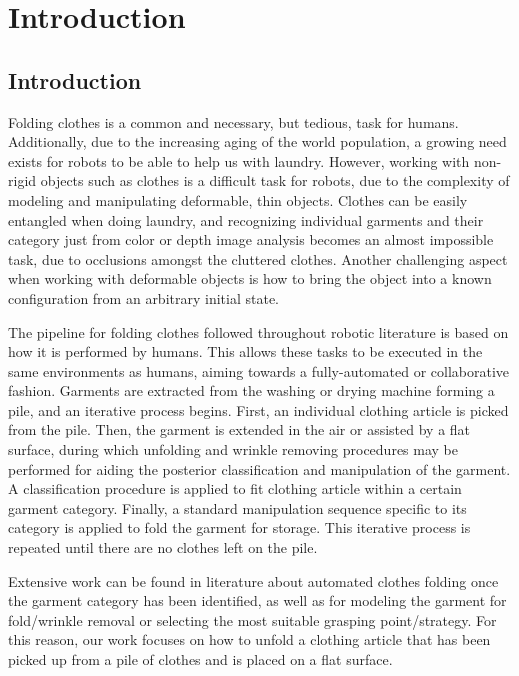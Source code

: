 \chapter{Introduction}
\label{introduction}

\section{Introduction}
\label{intro_introduction}
Folding clothes is a common and necessary, but tedious, task for humans. Additionally, due to the increasing aging of the world population, a growing need exists for robots to be able to help us with laundry.
However, working with non-rigid objects such as clothes is a difficult task for robots, due to the complexity of modeling and manipulating deformable, thin objects. Clothes can be easily entangled when doing laundry, and recognizing individual garments and their category just from color or depth image analysis becomes an almost impossible task, due to occlusions amongst the cluttered clothes. Another challenging aspect when working with deformable objects is how to bring the object into a known configuration from an arbitrary initial state.

The pipeline for folding clothes followed throughout robotic literature is based on how it is performed by humans. This allows these tasks to be executed in the same environments as humans, aiming towards a fully-automated or collaborative fashion. Garments are extracted from the washing or drying machine forming a pile, and an iterative process begins. First, an individual clothing article is picked from the pile. Then, the garment is extended in the air or assisted by a flat surface, during which unfolding and wrinkle removing procedures may be performed for aiding the posterior classification and manipulation of the garment. A classification procedure is applied to fit clothing article within a certain garment category. Finally, a standard manipulation sequence specific to its category is applied to fold the garment for storage. This iterative process is repeated until there are no clothes left on the pile.

Extensive work can be found in literature about automated clothes folding once the garment category has been identified, as well as for modeling the garment for fold/wrinkle removal or selecting the most suitable grasping point/strategy. For this reason, our work focuses on how to unfold a clothing article that has been picked up from a pile of clothes and is placed on a flat surface.



